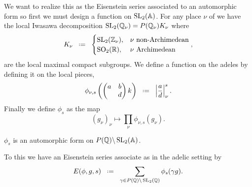 We want to realize this as the Eisenstein series associated to an automorphic form so first we must design a function on \(\SL_2(\A)\). For any place \(\nu\) of \Q we have the local Iwasawa decomposition \(\SL_2(\Q_\nu) = P(\Q_\nu) K_\nu\) where 
\[K_\nu \defeq \begin{cases}
	\SL_2(\Z_\nu), & \nu \text{ non-Archimedean}\\
	\SO_2(\R), & \nu \text{ Archimedean}
\end{cases},\]
 are the local maximal compact subgroups. We define a function on the adeles by defining it on the local pieces,
 \[\phi_{\nu, s}\left(\begin{pmatrix}
 	a & b\\ & d
 \end{pmatrix}k\right) \defeq \left| \frac{a}{d} \right|_\nu^s .\]
 Finally we define \(\phi_s\) as the map 
 \[(g_\nu)_{\nu} \mapsto \prod_\nu \phi_{\nu,s}(g_\nu).\]
 
 \begin{Lemma}
 	\(\phi_s\) is an automorphic form on \(P(\Q)\backslash \SL_2(\A)\).
 \end{Lemma}
 
 To this we have an Eisenstein series associate as in the adelic setting by 
 \[E(\phi, g,s) \defeq \sum_{\gamma\in P(\Q)\backslash \SL_2(\Q)} \phi_s(\gamma g) .\]


